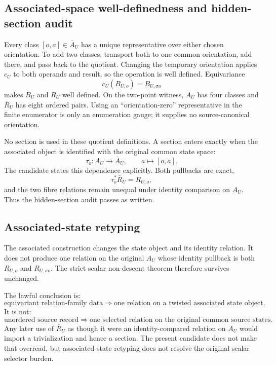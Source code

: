 \subsection{Associated-space well-definedness and hidden-section audit}

Every class \([o,a]\in\bar A_U\) has a unique representative over either
chosen orientation.  To add two classes, transport both to one common
orientation, add there, and pass back to the quotient.  Changing the temporary
orientation applies \(c_U\) to both operands and result, so the operation is
well defined.  Equivariance
\[
 c_U(B_{U,o})=B_{U,\sigma o}
\]
makes \(\bar B_U\) and \(\bar R_U\) well defined.  On the two-point witness,
\(\bar A_U\) has four classes and \(\bar R_U\) has eight ordered pairs.
Using an ``orientation-zero'' representative in the finite enumerator is only
an enumeration gauge; it supplies no source-canonical orientation.

No section is used in these quotient definitions.  A section enters exactly
when the associated object is identified with the original common state space:
\[
 \tau_o:A_U\longrightarrow\bar A_U,\qquad a\longmapsto[o,a].
\]
The candidate states this dependence explicitly.  Both pullbacks are exact,
\[
 \tau_o^*\bar R_U=R_{U,o},
\]
and the two fibre relations remain unequal under identity comparison on
\(A_U\).  Thus the hidden-section audit passes as written.

\subsection{Associated-state retyping}

The associated construction changes the state object and its identity
relation.  It does not produce one relation on the original \(A_U\) whose
identity pullback is both \(R_{U,o}\) and \(R_{U,\sigma o}\).  The strict
scalar non-descent theorem therefore survives unchanged.

The lawful conclusion is:
\[
 \text{equivariant relation-family data}
 \Longrightarrow
 \text{one relation on a twisted associated state object}.
\]
It is not:
\[
 \text{unordered source record}
 \Longrightarrow
 \text{one selected relation on the original common source states}.
\]
Any later use of \(\bar R_U\) as though it were an identity-compared relation
on \(A_U\) would import a trivialization and hence a section.  The present
candidate does not make that overread, but associated-state retyping does not
resolve the original scalar selector burden.

